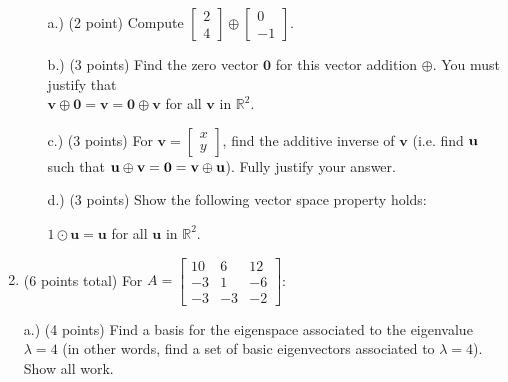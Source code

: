 \documentclass[12pt]{extarticle}
\begin{document}
\begin{enumerate}
    \begin{itemize}
\item[a.)] (2 point) Compute $\begin{bmatrix} 2 \\ 4\end{bmatrix}\oplus \begin{bmatrix} 0 \\ -1\end{bmatrix}$.
\vspace{1in}

\item[b.)](3 points) Find the zero vector $\mathbf{0}$ for this vector addition $\oplus$. You must justify that  \\ $\mathbf{v}\oplus\mathbf{0}=\mathbf{v}=\mathbf{0}\oplus\mathbf{v}$ for all $\mathbf{v}$ in $\mathbb{R}^2$.  
\vspace{2in}

\item[c.)] (3 points) For $\mathbf{v}=\begin{bmatrix} x\\ y \end{bmatrix}$, find the additive inverse of $\mathbf{v}$ (i.e. find ${\mathbf{u}}$ such that ${\mathbf{u}}\oplus{\mathbf{v}}=\mathbf{0}={\mathbf{v}}\oplus {\mathbf{u}}$). Fully justify your answer.

\vspace{2in}

\item[d.)](3 points) Show the following vector space property holds: 

$1\odot\mathbf{u}=\mathbf{u}$ for all $\mathbf{u}$ in $\mathbb{R}^2$.
    
    \end{itemize}

    \newpage

    






    
    
    
        \newpage




\item (6 points total) 
  For $A=\left[\begin{array}{ccc}
10 & 6 & 12 
\\
 -3 & 1 & -6 
\\
 -3 & -3 & -2 
\end{array}\right]
$: 

a.) (4 points) Find a basis for the eigenspace associated to the eigenvalue $\lambda=4$ (in other words, find a set of basic eigenvectors associated to $\lambda=4$). Show all work.


\end{enumerate}
\end{document}
